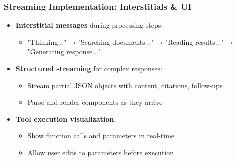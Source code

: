 \begin{frame}
    \frametitle{Streaming Implementation: Interstitials \& UI}
    
    \begin{itemize}
        \item \textbf{Interstitial messages} during processing steps:
        \begin{itemize}
            \item "Thinking..." → "Searching documents..." → "Reading results..." → "Generating response..."
        \end{itemize}
        \item \textbf{Structured streaming} for complex responses:
        \begin{itemize}
            \item Stream partial JSON objects with content, citations, follow-ups
            \item Parse and render components as they arrive
        \end{itemize}
        \item \textbf{Tool execution visualization}:
        \begin{itemize}
            \item Show function calls and parameters in real-time
            \item Allow user edits to parameters before execution
        \end{itemize}
    \end{itemize}
    
    \begin{center}
    \end{center}
\end{frame}

